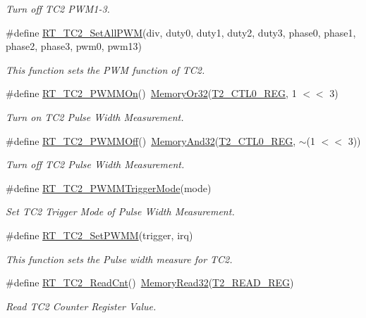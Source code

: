 \begin{DoxyCompactItemize}
\begin{DoxyCompactList}\small\item\em Turn off T\+C2 P\+W\+M1-\/3. \end{DoxyCompactList}\item 
\#define \mbox{\hyperlink{a00047_a49e7120e90142442bdd0744f61b572a5}{R\+T\+\_\+\+T\+C2\+\_\+\+Set\+All\+P\+WM}}(div,  duty0,  duty1,  duty2,  duty3,  phase0,  phase1,  phase2,  phase3,  pwm0,  pwm13)
\begin{DoxyCompactList}\small\item\em This function sets the P\+WM function of T\+C2. \end{DoxyCompactList}\item 
\#define \mbox{\hyperlink{a00047_a37ffb0b466d2a13bb9917a818b06776b}{R\+T\+\_\+\+T\+C2\+\_\+\+P\+W\+M\+M\+On}}()~\mbox{\hyperlink{a00020_a27874a97deab7cecdde5ddecf466e31e}{Memory\+Or32}}(\mbox{\hyperlink{a00020_adadaa0ab1ebbd7ba9b70dfd24c3ed44daf2e9deb36631241181cbf09e8d959475}{T2\+\_\+\+C\+T\+L0\+\_\+\+R\+EG}}, 1 $<$$<$ 3)
\begin{DoxyCompactList}\small\item\em Turn on T\+C2 Pulse Width Measurement. \end{DoxyCompactList}\item 
\#define \mbox{\hyperlink{a00047_abe6d0acfd60eb7058f0622de867c5b87}{R\+T\+\_\+\+T\+C2\+\_\+\+P\+W\+M\+M\+Off}}()~\mbox{\hyperlink{a00020_ad87cedffcaadc51db22594fce55173d4}{Memory\+And32}}(\mbox{\hyperlink{a00020_adadaa0ab1ebbd7ba9b70dfd24c3ed44daf2e9deb36631241181cbf09e8d959475}{T2\+\_\+\+C\+T\+L0\+\_\+\+R\+EG}}, $\sim$(1 $<$$<$ 3))
\begin{DoxyCompactList}\small\item\em Turn off T\+C2 Pulse Width Measurement. \end{DoxyCompactList}\item 
\#define \mbox{\hyperlink{a00047_a80f5ade258504a1243ccb058dd860475}{R\+T\+\_\+\+T\+C2\+\_\+\+P\+W\+M\+M\+Trigger\+Mode}}(mode)
\begin{DoxyCompactList}\small\item\em Set T\+C2 Trigger Mode of Pulse Width Measurement. \end{DoxyCompactList}\item 
\#define \mbox{\hyperlink{a00047_ad3b483689d5dd170a343222a71f43c9f}{R\+T\+\_\+\+T\+C2\+\_\+\+Set\+P\+W\+MM}}(trigger,  irq)
\begin{DoxyCompactList}\small\item\em This function sets the Pulse width measure for T\+C2. \end{DoxyCompactList}\item 
\#define \mbox{\hyperlink{a00047_a6591a513f367f6e7be0a90cb72aa3d49}{R\+T\+\_\+\+T\+C2\+\_\+\+Read\+Cnt}}()~\mbox{\hyperlink{a00020_a2d484dc15bdf30ee11ab3b05f31f0e16}{Memory\+Read32}}(\mbox{\hyperlink{a00020_adadaa0ab1ebbd7ba9b70dfd24c3ed44da2ce860fb68efa5daaac3e07dd534dd54}{T2\+\_\+\+R\+E\+A\+D\+\_\+\+R\+EG}})
\begin{DoxyCompactList}\small\item\em Read T\+C2 Counter Register Value. \end{DoxyCompactList}\end{DoxyCompactItemize}
